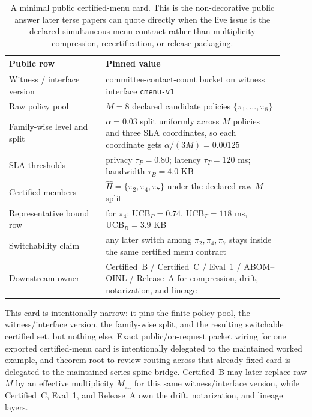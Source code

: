 \documentclass[11pt]{article}
\begin{document}
\begin{table}[t]
\centering
\small
\begin{tabular}{@{}p{0.32\linewidth}p{0.59\linewidth}@{}}
\toprule
\textbf{Public row} & \textbf{Pinned value}\\
\midrule
Witness / interface version & committee-contact-count bucket on witness interface \texttt{cmenu-v1} \\
Raw policy pool & $M=8$ declared candidate policies $\{\pi_1,\ldots,\pi_8\}$ \\
Family-wise level and split & $\alpha=0.03$ split uniformly across $M$ policies and three SLA coordinates, so each coordinate gets $\alpha/(3M)=0.00125$ \\
SLA thresholds & privacy $\tau_P=0.80$; latency $\tau_T=120$ ms; bandwidth $\tau_B=4.0$ KB \\
Certified members & $\widehat\Pi=\{\pi_2,\pi_4,\pi_7\}$ under the declared raw-$M$ split \\
Representative bound row & for $\pi_4$: $\mathrm{UCB}_P=0.74$, $\mathrm{UCB}_T=118$ ms, $\mathrm{UCB}_B=3.9$ KB \\
Switchability claim & any later switch among $\pi_2,\pi_4,\pi_7$ stays inside the same certified menu contract \\
Downstream owner & Certified~B / Certified~C / Eval~1 / ABOM--OINL / Release~A for compression, drift, notarization, and lineage \\
\bottomrule
\end{tabular}
\caption{A minimal public certified-menu card. This is the non-decorative public answer later terse papers can quote directly when the live issue is the declared simultaneous menu contract rather than multiplicity compression, recertification, or release packaging.}
\label{tab:minimal-certified-menu-card}
\end{table}

This card is intentionally narrow: it pins the finite policy pool, the witness/interface version, the family-wise split, and the resulting switchable certified set, but nothing else.
Exact public/on-request packet wiring for one exported certified-menu card is intentionally delegated to the maintained worked example, and theorem-root-to-review routing across that already-fixed card is delegated to the maintained series-spine bridge.
Certified~B may later replace raw $M$ by an effective multiplicity $M_{\mathrm{eff}}$ for this same witness/interface version, while Certified~C, Eval~1, and Release~A own the drift, notarization, and lineage layers.\cite{series:workedexample,series:seriesspines,series:sigcomp,series:recert,series:eval1,series:releaseA}
\end{document}
